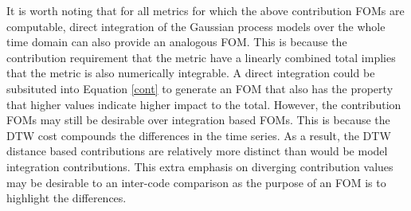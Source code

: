 It is worth noting that for all metrics for which the above contribution FOMs
are computable, direct integration of the Gaussian process models over 
the whole time domain can also provide an analogous FOM. This is because the
contribution requirement that the metric have a linearly combined total 
implies that the metric is also numerically integrable. A direct integration
could be subsituted into Equation \ref{cont} to generate an FOM that also 
has the property that higher values indicate higher impact
to the total. However, the contribution FOMs may still be desirable over 
integration based FOMs.  This is because the DTW cost compounds the 
differences in the time series. As a result, the DTW distance based 
contributions are relatively more distinct than would be model integration 
contributions. This extra emphasis on diverging contribution values may be 
desirable to an inter-code comparison as the purpose of an FOM is to 
highlight the differences. 
